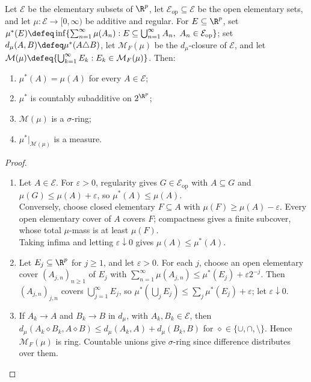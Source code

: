 \begin{theorem} \label{thm:rudin-measure-extension} \\
Let $\mathcal{E}$ be the elementary subsets of $\R^p$, let $\mathcal{E}_{\mathrm{op}}\subseteq\mathcal{E}$ be the open elementary sets, and let $\mu:\mathcal{E}\to[0,\infty)$ be additive and regular. For $E\subseteq\R^p$, set $\mu^\ast(E)\defeq\inf\{\sum_{n=1}^{\infty}\mu(A_n):E\subseteq\bigcup_{n=1}^{\infty}A_n,\ A_n\in\mathcal{E}_{\mathrm{op}}\}$; set $d_\mu(A,B)\defeq\mu^\ast(A\triangle B)$, let $\mathcal{M}_F(\mu)$ be the $d_\mu$-closure of $\mathcal{E}$, and let $\mathcal{M}(\mu)\defeq\{\bigcup_{k=1}^{\infty}E_k:E_k\in\mathcal{M}_F(\mu)\}$. Then:
\begin{enumerate}[label=(\roman*)]
\setlength{\itemsep}{0pt}
\item $\mu^\ast(A)=\mu(A)$ for every $A\in\mathcal{E}$;
\item $\mu^\ast$ is countably subadditive on $2^{\R^p}$;
\item $\mathcal{M}(\mu)$ is a $\sigma$-ring;
\item $\mu^\ast|_{\mathcal{M}(\mu)}$ is a measure.
\end{enumerate}
\begin{proof}
\begin{enumerate}[label=(\roman*)]
\setlength{\itemsep}{0pt}
\item Let $A\in\mathcal{E}$. For $\varepsilon>0$, regularity gives $G\in\mathcal{E}_{\mathrm{op}}$ with $A\subseteq G$ and $\mu(G)\leq\mu(A)+\varepsilon$, so $\mu^\ast(A)\leq\mu(A)$.\\
Conversely, choose closed elementary $F\subseteq A$ with $\mu(F)\geq\mu(A)-\varepsilon$. Every open elementary cover of $A$ covers $F$; compactness gives a finite subcover, whose total $\mu$-mass is at least $\mu(F)$.\\
Taking infima and letting $\varepsilon\downarrow0$ gives $\mu(A)\leq\mu^\ast(A)$.
\item Let $E_j\subseteq\R^p$ for $j\geq1$, and let $\varepsilon>0$. For each $j$, choose an open elementary cover $(A_{j,n})_{n\geq1}$ of $E_j$ with $\sum_{n=1}^{\infty}\mu(A_{j,n})\leq\mu^\ast(E_j)+\varepsilon2^{-j}$. Then $(A_{j,n})_{j,n}$ covers $\bigcup_{j=1}^{\infty}E_j$, so $\mu^\ast(\bigcup_jE_j)\leq\sum_j\mu^\ast(E_j)+\varepsilon$; let $\varepsilon\downarrow0$.
\item If $A_k\to A$ and $B_k\to B$ in $d_\mu$, with $A_k,B_k\in\mathcal{E}$, then $d_\mu(A_k\diamond B_k,A\diamond B)\leq d_\mu(A_k,A)+d_\mu(B_k,B)$ for $\diamond\in\{\cup,\cap,\setminus\}$. Hence $\mathcal{M}_F(\mu)$ is ring. Countable unions give $\sigma$-ring since difference distributes over them.

\end{enumerate}
\end{proof}
\end{theorem}
